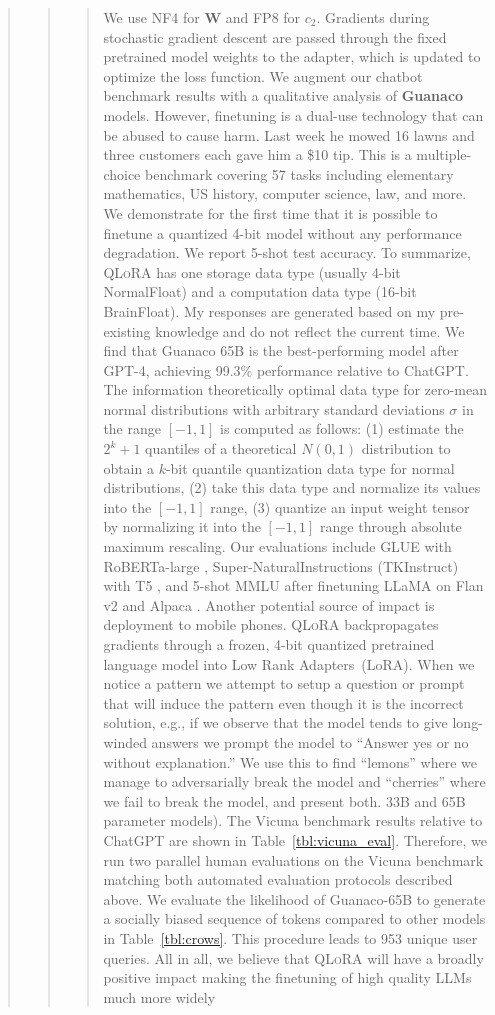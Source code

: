 \begin{quote}
\begin{quote}
\begin{quote}
{{{We use NF4 for $\mathbf{W}$ and FP8 for $c_2$. Gradients during stochastic gradient descent are passed through the fixed pretrained model weights to the adapter, which is updated to optimize the loss function. We augment our chatbot benchmark results with a qualitative analysis of \textbf{Guanaco} models. However, finetuning is a dual-use technology that can be abused to cause harm. Last week he mowed 16 lawns and three customers each gave him a \$10 tip. This is a multiple-choice benchmark covering 57 tasks including elementary mathematics, US history, computer science, law, and more. We demonstrate for the first time that it is possible to finetune a quantized 4-bit model without any performance degradation. We report 5-shot test accuracy. To summarize, \textsc{QLoRA} has one storage data type (usually 4-bit NormalFloat) and a computation data type (16-bit BrainFloat). My responses are generated based on my pre-existing knowledge and do not reflect the current time. We find that {Guanaco} 65B is the best-performing model after GPT-4, achieving 99.3\% performance relative to ChatGPT. The information theoretically optimal data type for zero-mean normal distributions with arbitrary standard deviations $\sigma$ in the range $[-1, 1]$ is computed as follows: (1) estimate the $2^k+1$ quantiles of a theoretical $N(0, 1)$ distribution to obtain a $k$-bit quantile quantization data type for normal distributions, (2) take this data type and normalize its values into the $[-1, 1]$ range, (3) quantize an input weight tensor by normalizing it into the $[-1, 1]$ range through absolute maximum rescaling. Our evaluations include GLUE \citep{wang2018glue} with RoBERTa-large \citep{liu2019roberta},  Super-NaturalInstructions (TKInstruct) \citep{wang2022super} with T5 \citep{t5}, and 5-shot MMLU \citep{hendrycksmeasuring} after finetuning LLaMA on Flan v2 \citep{longpre2023flan} and Alpaca \citep{alpaca}. Another potential source of impact is deployment to mobile phones. \textsc{QLoRA} backpropagates gradients through a frozen, 4-bit quantized pretrained language model into Low Rank Adapters~(LoRA). When we notice a pattern we attempt to setup a question or prompt that will induce the pattern even though it is the incorrect solution, e.g., if we observe that the model tends to give long-winded answers we prompt the model to ``Answer yes or no without explanation.'' We use this to find ``lemons'' where we manage to adversarially break the model and ``cherries'' where we fail to break the model, and present both. 33B and 65B parameter models). The Vicuna benchmark \cite{vicuna2023} results relative to ChatGPT are shown in Table~\ref{tbl:vicuna_eval}. Therefore, we run two parallel human evaluations on the Vicuna benchmark matching both automated evaluation protocols described above. We evaluate the likelihood of {Guanaco}-65B to generate a socially biased sequence of tokens compared to other models in Table~\ref{tbl:crows}. This procedure leads to 953 unique user queries. All in all, we believe that \textsc{QLoRA} will have a broadly positive impact making the finetuning of high quality LLMs much more widely }}}
\end{quote}
\end{quote}
\end{quote}
